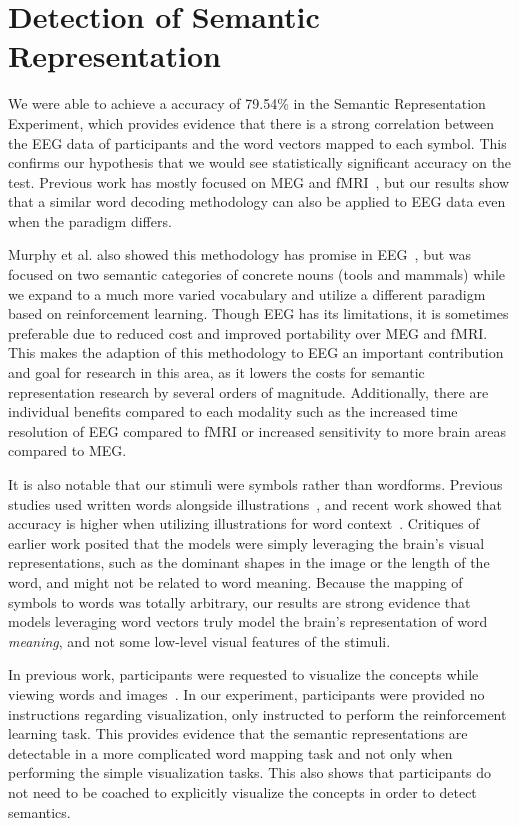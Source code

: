 \section{Detection of Semantic Representation}
\label{sec:discussion:detectionofsemanticrepresentation}
We were able to achieve a \tvt accuracy of 79.54\% in the Semantic 
Representation Experiment, which provides evidence that there is a strong 
correlation between the EEG data of participants and the word vectors mapped to 
each symbol. This confirms our hypothesis that we would see statistically 
significant accuracy on the \tvt test. Previous work has mostly focused on MEG 
and fMRI~\cite{Mitchell2008,Sudre2012}, but our results show that a similar 
word decoding methodology can also be applied to EEG data even when the 
paradigm differs. 

Murphy et al. also showed this methodology has promise in 
EEG~\cite{Murphy2009}, but was focused on two semantic categories of concrete 
nouns (tools and mammals) while we expand to a much more varied vocabulary and 
utilize a different paradigm based on reinforcement learning. Though EEG has 
its limitations, it is sometimes preferable due to reduced cost and improved 
portability over MEG and fMRI. This makes the adaption of this methodology to 
EEG an important contribution and goal for research in this area, as it lowers 
the costs for semantic representation research by several orders of magnitude.  
Additionally, there are individual benefits compared to each modality such as 
the increased time resolution of EEG compared to fMRI or increased sensitivity 
to more brain areas compared to MEG.

It is also notable that our stimuli were symbols rather than wordforms. 
Previous studies used written words alongside 
illustrations~\cite{Mitchell2008,Sudre2012}, and recent work showed that 
accuracy is higher when utilizing illustrations for word 
context~\cite{pereira2018toward}. Critiques of earlier work posited that the 
models were simply leveraging the brain's visual representations, such as the 
dominant shapes in the image or the length of the word, and might not be 
related to word meaning. Because the mapping of symbols to words was totally 
arbitrary, our results are strong evidence that models leveraging word vectors 
truly model the brain's representation of word \emph{meaning}, and not some 
low-level visual features of the stimuli.

In previous work, participants were requested to visualize the concepts while 
viewing words and images~\cite{Mitchell2008,Sudre2012}. In our experiment, 
participants were provided no instructions regarding visualization, only 
instructed to perform the reinforcement learning task. This provides evidence 
that the semantic representations are detectable in a more complicated word 
mapping task and not only when performing the simple visualization tasks. This 
also shows that participants do not need to be coached to explicitly visualize 
the concepts in order to detect semantics.

